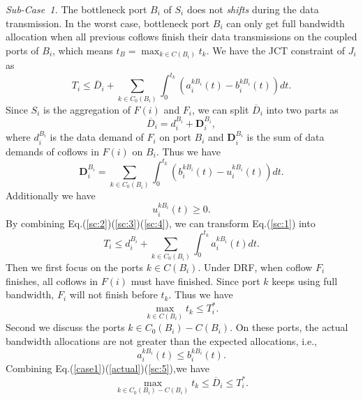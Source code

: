 \documentclass[10pt, conference, letterpaper]{IEEEtran}
\begin{document}
\begin{IEEEproof}
\emph{Sub-Case~1.} The bottleneck port $B_i$ of $S_i$ does not \emph{shifts} during the data transmission. In the worst case, bottleneck port $B_i$ can only get full bandwidth allocation when all previous coflows finish their data transmissions on the coupled ports of $B_i$, which means $t_B = \max_{k\in C(B_i)}t_k$. We have the JCT constraint of $J_i$ as
\begin{equation}\label{sc:1}
	T_i \leq \overline{D}_i + \sum_{k\in C_0(B_i)}\int_0^{t_k}(a_i^{kB_i}(t)-b_i^{kB_i}(t))dt.
\end{equation}
Since $S_i$ is the aggregation of $F(i)$ and $F_i$, we can split $\overline{D}_i$ into two parts as
\begin{equation}\label{sc:2}
	\overline{D}_i = d_i^{B_i} + \mathbf{D}_i^{B_i},
\end{equation}
where $d_i^{B_i}$ is the data demand of $F_i$ on port $B_i$ and $\mathbf{D}_i^{B_i}$ is the sum of data demands of coflows in $F(i)$ on $B_i$. Thus we have
\begin{equation}\label{sc:3}
	\mathbf{D}_i^{B_i} = \sum_{k\in C_0(B_i)}\int_0^{t_k}(b_i^{kB_i}(t)-u_i^{kB_i}(t))dt.
\end{equation}
Additionally we have 
\begin{equation}\label{sc:4}
	u_i^{kB_i}(t) \geq 0.
\end{equation}
By combining Eq.(\ref{sc:2})(\ref{sc:3})(\ref{sc:4}), we can transform Eq.(\ref{sc:1}) into
\begin{equation}\label{sc:1-0}
	T_i \leq d_i^{B_i} + \sum_{k\in C_0(B_i)}\int_0^{t_k}a_i^{kB_i}(t)dt.
\end{equation}
Then we first focus on the ports $k$$\in$$C(B_i)$. Under DRF, when coflow $F_i$ finishes, all coflows in $F(i)$ must have finished. Since port $k$ keeps using full bandwidth, $F_i$ will not finish before $t_k$. Thus we have
\begin{equation}\label{sc:1-1}
	\max_{k\in C(B_i)}t_k \leq T_i^*.
\end{equation}
Second we discuss the ports $k$$\in$$C_0(B_i)-C(B_i)$. On these ports, the actual bandwidth allocations are not greater than the expected allocations, i.e.,
\begin{equation}\label{sc:5}
	a_i^{kB_i}(t)\leq b_i^{kB_i}(t).
\end{equation}
Combining Eq.(\ref{case1})(\ref{actual})(\ref{sc:5}),we have
\begin{equation}\label{sc:1-2}
	\max_{k \in C_0(B_i)-C(B_i)} t_k \leq \overline{D}_i \leq T_i^*.
\end{equation}

\end{IEEEproof}
\end{document}
